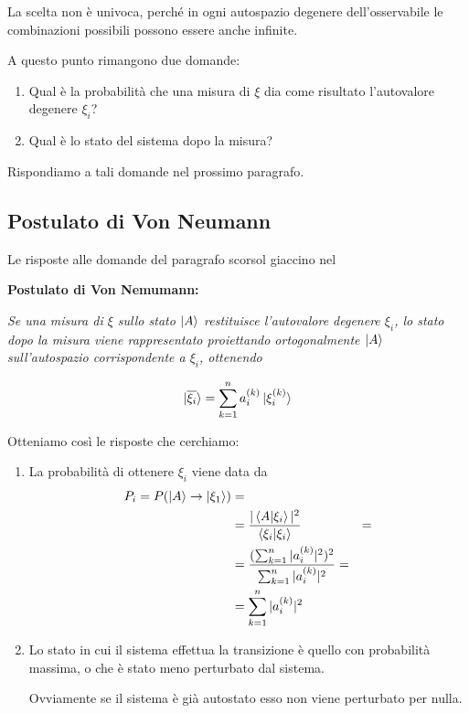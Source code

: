 La scelta non è univoca, perché in ogni autospazio degenere dell'osservabile le combinazioni possibili possono essere anche infinite.

A questo punto rimangono due domande:

\begin{enumerate}
	\item Qual è la probabilità che una misura di $\xi$ dia come risultato l'autovalore degenere $\xi_i$?
	\item Qual è lo stato del sistema dopo la misura?
\end{enumerate}

Rispondiamo a tali domande nel prossimo paragrafo.
 
\subsection{Postulato di Von Neumann}
 
Le risposte alle domande del paragrafo scorsol giaccino nel 

\bigskip

\textbf{Postulato di Von Nemumann:} 

\textit{Se una misura di $\xi$ sullo stato $\ket{A}$ restituisce l'autovalore degenere $\xi_i$, lo stato dopo la misura viene rappresentato proiettando ortogonalmente $\ket{A}$ sull'autospazio corrispondente a $\xi_i$, ottenendo}

\begin{align}
\ket{\overline{\xi_i}}= \sum_{k=1}^n a_i^{(k)}\ket{\xi^{(k)}_i}
\end{align} 

\bigskip

Otteniamo così le risposte che cerchiamo:

\begin{enumerate}
	\item La probabilità di ottenere $\xi_i$ viene data da
	\begin{align}
	P_i=P(\ket{A} \rightarrow \ket{\xi_1}){}&= \nonumber \\ &=\frac{|\braket{A|\xi_i}|^2}{\braket{\xi_i|\xi_i}} &= \nonumber \\
	&=\frac{(\sum_{k=1}^n |a_i^{(k)}|^2)^2}{\sum_{k=1}^n |a_i^{(k)}|^2}= \nonumber \\ &=\sum_{k=1}^n |a_i^{(k)}|^2
	\end{align}
	\item Lo stato in cui il sistema effettua la transizione è quello con probabilità massima, o che è stato meno perturbato dal sistema.
	
	Ovviamente se il sistema è già autostato esso non viene perturbato per nulla.
\end{enumerate}

